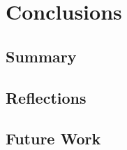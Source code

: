 \chapter{Conclusions}
\label{ch:conclusions}

\section{Summary}
\label{sec:summary}

\section{Reflections}
\label{sec:reflections}

\section{Future Work}
\label{sec:futureWork}